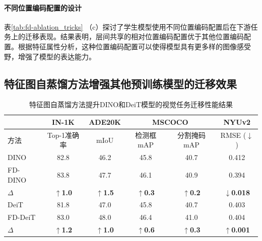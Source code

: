 \paragraph{不同位置编码配置的设计} 表\ref{tab:fd-ablation_tricks} （c）探讨了学生模型使用不同位置编码配置后在下游任务上的迁移表现。结果表明，层间共享的相对位置编码配置优于其他位置编码配置。根据特征属性分析，这种位置编码配置可以使得模型具有更多样的图像感受野，增强了模型的表达能力。

\subsection{特征图自蒸馏方法增强其他预训练模型的迁移效果}
\label{sec:fd-more-models}


\begin{table}
\caption{
特征图自蒸馏方法提升DINO和DeiT模型的视觉任务迁移性能结果
}
\centering
  \begin{tabular}{lccccc}
\toprule
   & IN-1K & ADE20K & \multicolumn{2}{c}{MSCOCO} & NYUv2 \\
   \midrule
方法    &  Top-1准确率   &  mIoU  & 检测框mAP & 分割掩码mAP & RMSE\scriptsize{ ($\downarrow$)}\\
  \midrule
  DINO & 82.8 & 46.2 & 45.8 & 40.7 & 0.412 \\
  FD-DINO & 83.8 & 47.7 & 46.1 & 40.9 & 0.394 \\
  $\Delta$ & \textbf{$\uparrow$1.0} & \textbf{$\uparrow$1.5} & \textbf{$\uparrow$0.3} & \textbf{$\uparrow$0.2} & \textbf{$\downarrow$0.018} \\
  \midrule
  
  DeiT & 81.8 & 47.0 & 45.8 & 40.7 & 0.403 \\
  FD-DeiT & 83.0 & 48.0 & 46.4 & 41.0 & 0.404 \\
  $\Delta$ & \textbf{$\uparrow$1.2} & \textbf{$\uparrow$1.0} & \textbf{$\uparrow$0.6} & \textbf{$\uparrow$0.3} & \textbf{$\uparrow$0.001} \\
\bottomrule
  \end{tabular}
\label{tab:fd-extend_dino_deit}
\end{table}

